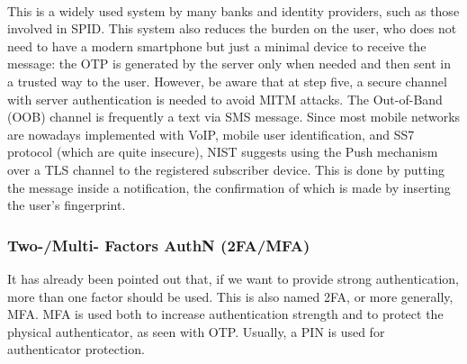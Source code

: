 \paragraph*{}
This is a widely used system by many banks and identity providers, such as those involved in SPID. This system also reduces the burden on the user, who does not need to have a modern smartphone but just a minimal device to receive the message: the OTP is generated by the server only when needed and then sent in a trusted way to the user. However, be aware that at step five, a secure channel with server authentication is needed to avoid MITM attacks. The Out-of-Band (OOB) channel is frequently a text via SMS message. Since most mobile networks are nowadays implemented with VoIP, mobile user identification, and SS7 protocol (which are quite insecure), NIST suggests using the Push mechanism over a TLS channel to the registered subscriber device. This is done by putting the message inside a notification, the confirmation of which is made by inserting the user's fingerprint.


\subsubsection{Two-/Multi- Factors AuthN (2FA/MFA)}
It has already been pointed out that, if we want to provide strong authentication, more than one factor should be used. This is also named 2FA, or more generally, MFA. MFA is used both to increase authentication strength and to protect the physical authenticator, as seen with OTP. Usually, a PIN is used for authenticator protection.